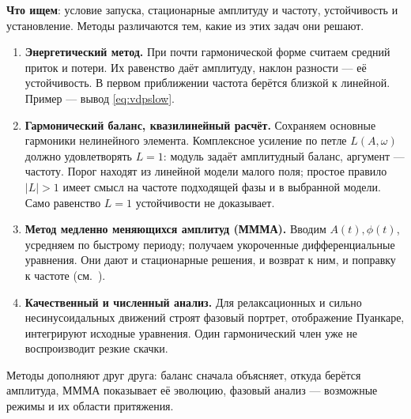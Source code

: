 \textbf{Что ищем}: условие запуска, стационарные амплитуду и частоту, устойчивость и установление. Методы различаются тем, какие из этих задач они решают.
\begin{enumerate}
\item \textbf{Энергетический метод.} При почти гармонической форме считаем средний приток и потери. Их равенство даёт амплитуду, наклон разности --- её устойчивость. В первом приближении частота берётся близкой к линейной. Пример --- вывод \eqref{eq:vdpslow}.
\item \textbf{Гармонический баланс, квазилинейный расчёт.} Сохраняем основные гармоники нелинейного элемента. Комплексное усиление по петле $L(A,\omega)$ должно удовлетворять $L=1$: модуль задаёт амплитудный баланс, аргумент --- частоту. Порог находят из линейной модели малого поля; простое правило $|L|>1$ имеет смысл на частоте подходящей фазы и в выбранной модели. Само равенство $L=1$ устойчивости не доказывает.
\item \textbf{Метод медленно меняющихся амплитуд (МММА).} Вводим $A(t),\phi(t)$, усредняем по быстрому периоду; получаем укороченные дифференциальные уравнения. Они дают и стационарные решения, и возврат к ним, и поправку к частоте (см.~).
\item \textbf{Качественный и численный анализ.} Для релаксационных и сильно несинусоидальных движений строят фазовый портрет, отображение Пуанкаре, интегрируют исходные уравнения. Один гармонический член уже не воспроизводит резкие скачки.
\end{enumerate}
Методы дополняют друг друга: баланс сначала объясняет, откуда берётся амплитуда, МММА показывает её эволюцию, фазовый анализ --- возможные режимы и их области притяжения.
